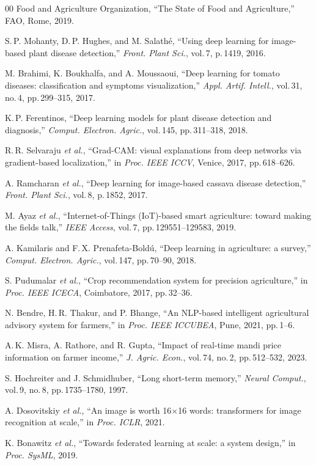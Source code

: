 \documentclass[conference]{IEEEtran}
\begin{document}
\begin{thebibliography}{00}
Food and Agriculture Organization, ``The State of Food and Agriculture,''
FAO, Rome, 2019.

S.\,P. Mohanty, D.\,P. Hughes, and M. Salath\'e, ``Using deep learning
for image-based plant disease detection,'' \textit{Front. Plant Sci.},
vol.\,7, p.\,1419, 2016.

M. Brahimi, K. Boukhalfa, and A. Moussaoui, ``Deep learning for tomato
diseases: classification and symptoms visualization,'' \textit{Appl.
Artif. Intell.}, vol.\,31, no.\,4, pp.\,299--315, 2017.

K.\,P. Ferentinos, ``Deep learning models for plant disease detection
and diagnosis,'' \textit{Comput. Electron. Agric.}, vol.\,145,
pp.\,311--318, 2018.

R.\,R. Selvaraju \textit{et al.}, ``Grad-CAM: visual explanations from
deep networks via gradient-based localization,'' in \textit{Proc. IEEE
ICCV}, Venice, 2017, pp.\,618--626.

A. Ramcharan \textit{et al.}, ``Deep learning for image-based cassava
disease detection,'' \textit{Front. Plant Sci.}, vol.\,8, p.\,1852, 2017.

M. Ayaz \textit{et al.}, ``Internet-of-Things (IoT)-based smart
agriculture: toward making the fields talk,'' \textit{IEEE Access},
vol.\,7, pp.\,129551--129583, 2019.

A. Kamilaris and F.\,X. Prenafeta-Bold\'u, ``Deep learning in
agriculture: a survey,'' \textit{Comput. Electron. Agric.}, vol.\,147,
pp.\,70--90, 2018.

S. Pudumalar \textit{et al.}, ``Crop recommendation system for precision
agriculture,'' in \textit{Proc. IEEE ICECA}, Coimbatore, 2017,
pp.\,32--36.

N. Bendre, H.\,R. Thakur, and P. Bhange, ``An NLP-based intelligent
agricultural advisory system for farmers,'' in \textit{Proc. IEEE
ICCUBEA}, Pune, 2021, pp.\,1--6.

A.\,K. Misra, A. Rathore, and R. Gupta, ``Impact of real-time mandi
price information on farmer income,'' \textit{J. Agric. Econ.},
vol.\,74, no.\,2, pp.\,512--532, 2023.

S. Hochreiter and J. Schmidhuber, ``Long short-term memory,'' \textit{Neural
Comput.}, vol.\,9, no.\,8, pp.\,1735--1780, 1997.

A. Dosovitskiy \textit{et al.}, ``An image is worth 16$\times$16 words:
transformers for image recognition at scale,'' in \textit{Proc. ICLR},
2021.

K. Bonawitz \textit{et al.}, ``Towards federated learning at scale: a
system design,'' in \textit{Proc. SysML}, 2019.
\end{thebibliography}
\end{document}
